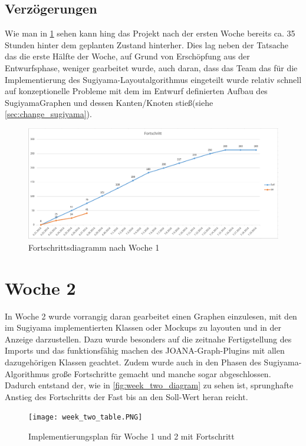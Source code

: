 \subsection{Verzögerungen}
Wie man in \ref{fig:week_one_diagram} sehen kann hing das Projekt nach der ersten Woche bereits ca. 35 Stunden hinter dem geplanten Zustand hinterher.
Dies lag neben der Tatsache das die erste Hälfte der Woche, auf Grund von Erschöpfung aus der Entwurfsphase, weniger gearbeitet wurde, auch daran, dass das Team das für die Implementierung des Sugiyama-Layoutalgorithmus eingeteilt wurde relativ schnell auf konzeptionelle Probleme mit dem im Entwurf definierten Aufbau des SugiyamaGraphen und dessen Kanten/Knoten stieß(siehe \ref{sec:change_sugiyama}).

\begin{figure}[!htbp]
	\centering
	\includegraphics[width=380pt]{resourcen/week_one_diagram.PNG}
	\caption{Fortschrittsdiagramm nach Woche 1}
	\label{fig:week_one_diagram}
\end{figure}
\newpage

\section{Woche 2}
In Woche 2 wurde vorrangig daran gearbeitet einen Graphen einzulesen, mit den im Sugiyama implementierten Klassen oder Mockups zu layouten und in der Anzeige darzustellen. Dazu wurde besonders auf die zeitnahe Fertigstellung des Imports und das funktionsfähig machen des JOANA-Graph-Plugins mit allen dazugehörigen Klassen geachtet. Zudem wurde auch in den Phasen des Sugiyama-Algorithmus große Fortschritte gemacht und manche sogar abgeschlossen. Dadurch entstand der, wie in \ref{fig:week_two_diagram} zu sehen ist, sprunghafte Anstieg des Fortschritts der Fast bis an den Soll-Wert heran reicht. 
\begin{figure}[!htbp]
	\centering
	\texttt{[image: week\_two\_table.PNG]}
	\caption{Implementierungsplan für Woche 1 und 2 mit Fortschritt}
	\label{fig:week_two_table}
\end{figure}
